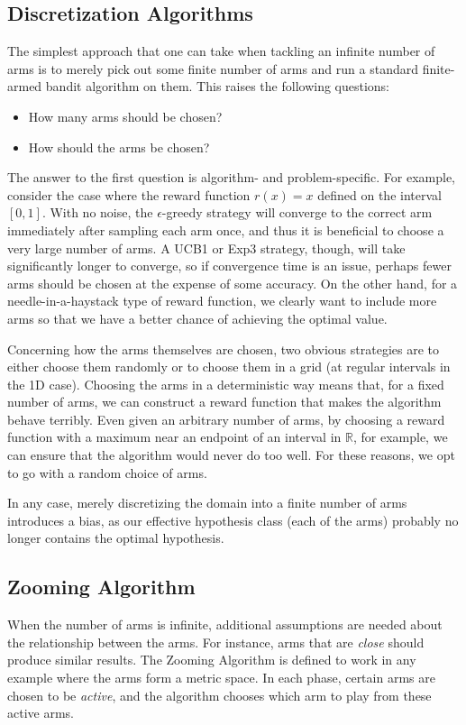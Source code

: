 \documentclass{article}
\begin{document}
\subsection{Discretization Algorithms}
The simplest approach that one can take when tackling an infinite number of
arms is to merely pick out some finite number of arms and run a standard
finite-armed bandit algorithm on them.  This raises the following 
questions:
\begin{itemize}
\item How many arms should be chosen?
\item How should the arms be chosen?
\end{itemize}
The answer to the first question is algorithm- and problem-specific.  For
example, consider the case where the reward function $r(x) = x$ defined
on the interval $[0,1]$.  With no noise, the $\epsilon$-greedy strategy
will converge to the correct arm immediately after sampling each arm once,
and thus it is beneficial to choose a very large number of arms.  A
UCB1 or Exp3 strategy, though, will take significantly longer to
converge, so if convergence time is an issue, perhaps fewer arms should be
chosen at the expense of some accuracy.  On the other hand, for a
needle-in-a-haystack type of reward function, we clearly want to
include more arms so that we have a better chance of achieving the
optimal value.

Concerning how the arms themselves are chosen, two obvious strategies are
to either choose them randomly or to choose them in a grid (at regular
intervals in the 1D case).  Choosing the arms in a deterministic way
means that, for a fixed number of arms, we can construct a reward function
that makes the algorithm behave terribly.  Even given an arbitrary number
of arms, by choosing a reward function with a maximum near an endpoint of
an interval in $\mathbb{R}$, for example, we can ensure that the algorithm
would never do too well.  For these reasons, we opt to go with a random
choice of arms.

In any case, merely discretizing the domain into a finite number of arms
introduces a bias, as our effective hypothesis class (each of the arms)
probably no longer contains the optimal hypothesis.

\subsection{Zooming Algorithm}
When the number of arms is infinite, additional assumptions are needed
about the relationship between the arms. For instance, arms
that are \emph{close} should produce similar results. The Zooming
Algorithm is defined to work in any example where the arms form a
metric space. In each phase, certain arms are chosen to be
\emph{active}, and the algorithm chooses which arm to play from these
active arms.
\end{document}
